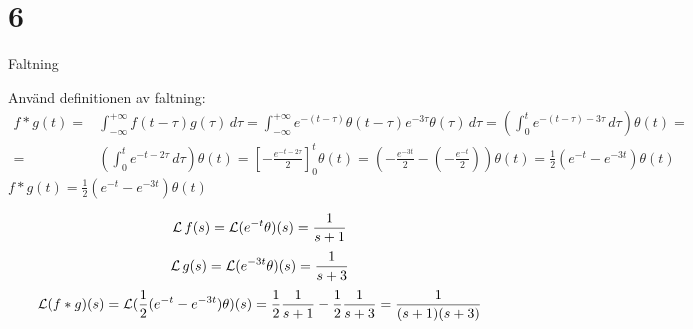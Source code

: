 \chapter{6}{Faltning}

\begin{task}{6.1}
	Använd definitionen av faltning:
	\begin{align*}
	f*g(t)=
	&\int_{-\infty}^{+\infty}\! f(t-\tau)g(\tau)\, d\tau=
	\int_{-\infty}^{+\infty}\! e^{-(t-\tau)}\theta(t-\tau)e^{-3\tau}\theta(\tau)\, d\tau=
	\left(\int_{0}^{t}\! e^{-(t-\tau)-3\tau}\, d\tau\right)\theta(t)= \\ =
	&\left(\int_{0}^{t}\! e^{-t-2\tau}\, d\tau\right)\theta(t)=
	\left[-\frac{e^{-t-2\tau}}{2}\right]_0^t\theta(t)=
	\left(-\frac{e^{-3t}}{2}-\left(-\frac{e^{-t}}{2}\right)\right)\theta(t)=
	\frac{1}{2}(e^{-t}-e^{-3t})\theta(t)
	\end{align*}
	\ans $f*g(t)=\frac{1}{2}(e^{-t}-e^{-3t})\theta(t)$
\end{task}

\begin{task}{6.2}
	\begin{align*}
	\operatorname{\mathcal{L}} f(s)=
	\operatorname{\mathcal{L}} (e^{-t}\theta)(s)=
	\frac{1}{s+1}
	\end{align*}
	\begin{align*}
	\operatorname{\mathcal{L}} g(s)=
	\operatorname{\mathcal{L}} (e^{-3t}\theta)(s)=
	\frac{1}{s+3}
	\end{align*}
	\begin{align*}
	\laplace (f*g)(s)=
	\laplace (\frac{1}{2}(e^{-t}-e^{-3t})\theta)(s)=
	\frac{1}{2}\*\frac{1}{s+1}-\frac{1}{2}\*\frac{1}{s+3}=
	\frac{1}{(s+1)(s+3)}
	\end{align*}
\end{task}